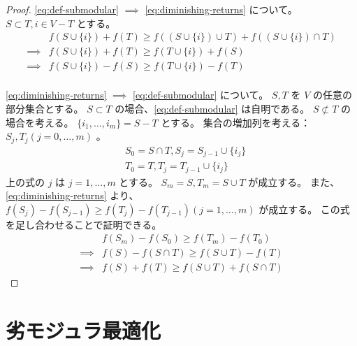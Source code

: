 \documentclass{classes/report}
\begin{document}
\begin{proof}
    \ref{eq:def-submodular} $\implies$ \ref{eq:diminishing-returns} について。
    $S \subset T, i \in V - T$ とする。
    \begin{align*}
        &f(S \cup \{i\}) + f(T) \ge f((S \cup \{i\}) \cup T) + f((S \cup \{i\}) \cap T) \\
        \implies &f(S \cup \{i\}) + f(T) \ge f(T \cup \{i\}) + f(S) \\
        \implies &f(S \cup \{i\}) - f(S) \ge f(T \cup \{i\}) - f(T) \\
    \end{align*}

    \ref{eq:diminishing-returns} $\implies$ \ref{eq:def-submodular} について。
    $S, T$ を $V$ の任意の部分集合とする。
    $S \subset T$ の場合、\ref{eq:def-submodular} は自明である。
    $S \not \subset T$ の場合を考える。
    $\{i_1, \dots, i_m\} = S - T$ とする。
    集合の増加列を考える：$S_j, T_j (j=0, \dots, m)$ 。
    \begin{align*}
        &S_0 = S \cap T , S_j = S_{j-1} \cup \{i_j\} \\
        &T_0 = T        , T_j = T_{j-1} \cup \{i_j\}
    \end{align*}
    上の式の $j$ は $j=1, \dots, m$ とする。
    $S_m = S, T_m = S \cup T$ が成立する。
    また、 \ref{eq:diminishing-returns} より、$f(S_j) - f(S_{j-1}) \ge f(T_j) - f(T_{j-1})  (j=1, \dots, m)$ が成立する。
    この式を足し合わせることで証明できる。
    \begin{align*}
        &f(S_m) - f(S_0) \ge f(T_m) - f(T_0) \\
        \implies &f(S) - f(S \cap T) \ge f(S \cup T) - f(T) \\
        \implies &f(S) + f(T) \ge f(S \cup T) + f(S \cap T)
    \end{align*}
\end{proof}

\begin{tcolorbox}
    \begin{eg}[カバー関数]
    \end{eg}
    \begin{eg}[グラフのカット関数]
    \end{eg}
    \begin{eg}[凹関数が生成する関数]
    \end{eg}
\end{tcolorbox}

\chapter{劣モジュラ最適化}
\end{document}
